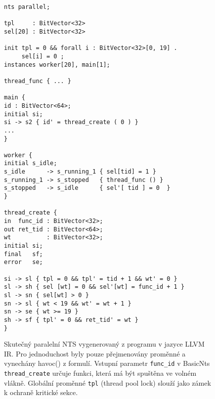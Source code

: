 \documentclass{fithesis2}
\begin{document}
\begin{figure}[h!]
\begin{lstlisting}[breaklines=true]
nts parallel;

tpl     : BitVector<32>
sel[20] : BitVector<32>

init tpl = 0 && forall i : BitVector<32>[0, 19] .
     sel[i] = 0 ;
instances worker[20], main[1];

thread_func { ... }

main {
id : BitVector<64>;
initial	si;
si -> s2 { id' = thread_create ( 0 ) }
...
}

worker {
initial	s_idle;
s_idle      -> s_running_1 { sel[tid] = 1 }
s_running_1 -> s_stopped   { thread_func () }
s_stopped   -> s_idle      { sel'[ tid ] = 0  }
}

thread_create {
in  func_id : BitVector<32>;
out ret_tid : BitVector<64>;
wt          : BitVector<32>;
initial	si;
final	sf;
error	se;

si -> sl { tpl = 0 && tpl' = tid + 1 && wt' = 0 }
sl -> sh { sel [wt] = 0 && sel'[wt] = func_id + 1 }
sl -> sn { sel[wt] > 0 }
sn -> sl { wt < 19 && wt' = wt + 1 }
sn -> se { wt >= 19 }
sh -> sf { tpl' = 0 && ret_tid' = wt }
}
\end{lstlisting}
\caption{Skutečný paralelní NTS vygenerovaný z programu v jazyce LLVM IR. Pro jednoduchost byly pouze přejmenovány proměnné a vynechány havoc() z formulí. Vstupní parametr \texttt{func\_id} v BasicNts \texttt{thread\_create} určuje funkci, která má být spuštěna ve volném vlákně. Globální proměnné \texttt{tpl} (thread pool lock) slouží jako zámek k ochraně kritické sekce.}
\label{fig:appendix:real-parallel-nts}
\end{figure}

\tableofcontents

\printbibliography
\end{document}
